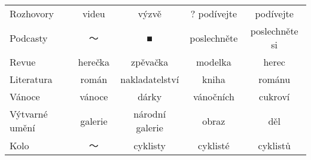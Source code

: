 \begin{table}
\begin{tabular}{lcccc}
Rozhovory      &           videu &            výzvě &    ? podívejte &       podívejte \\
Podcasty       &               〜 &                ■ &    poslechněte &  poslechněte si \\
Revue          &         herečka &         zpěvačka &        modelka &           herec \\
Literatura     &           román &   nakladatelství &          kniha &          románu \\
Vánoce         &          vánoce &            dárky &      vánočních &         cukroví \\
Výtvarné umění &         galerie &  národní galerie &          obraz &             děl \\
Kolo           &               〜 &         cyklisty &       cyklisté &        cyklistů \\
\bottomrule
\end{tabular}
\end{table}
